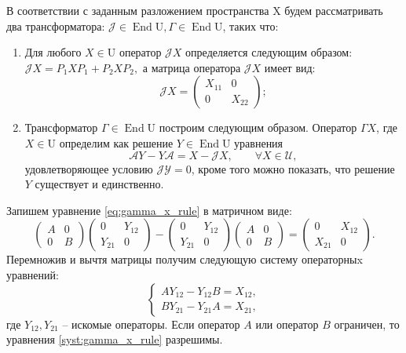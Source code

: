 В соответствии с заданным разложением пространства $\mathrm{X}$ будем рассматривать два трансформатора: $\mathcal{J} \in \operatorname{End}\mathrm{U}, \Gamma \in \operatorname{End}\mathrm{U}$, таких что:
\begin{enumerate}
	\item Для любого $X \in \mathrm{U}$ оператор $\mathcal{J}X$ определяется следующим образом: $\mathcal{J}X = P_1XP_1 + P_2XP_2,$ а матрица оператора $\mathcal{J}X$ имеет вид:
	$$
	\mathcal{J}X = \begin{pmatrix}
		X_{11} & 0 \\
		0 & X_{22}
	\end{pmatrix};
	$$
	\item Трансформатор $\Gamma \in \operatorname{End}\mathrm{U}$ построим следующим образом. Оператор 
	$\Gamma X$, где $X \in \mathrm{U}$ определим как решение $Y \in \operatorname{End}\mathrm{U}$ уравнения
	\begin{equation}\label{eq:gamma_x_rule}
		\mathcal{A}Y - Y\mathcal{A} = X - \mathcal{J}X,\qquad \forall X \in \mathcal{U},
	\end{equation}
	удовлетворяющее условию $\mathcal{J}\mathcal{Y} = 0$, кроме того можно показать, что решение 
	$Y$ существует и единственно.
\end{enumerate}
Запишем уравнение \eqref{eq:gamma_x_rule} в матричном виде:
$$
\begin{pmatrix}
		A & 0 \\
		0 & B
\end{pmatrix}
\begin{pmatrix}
		0 & Y_{12} \\
		Y_{21} & 0
\end{pmatrix} -
\begin{pmatrix}
		0 & Y_{12} \\
		Y_{21} & 0
\end{pmatrix}
\begin{pmatrix}
		A & 0 \\
		0 & B
\end{pmatrix} =
\begin{pmatrix}
		0 & X_{12} \\
		X_{21} & 0
\end{pmatrix}.	 	
$$
Перемножив и вычтя матрицы получим следующую систему операторныx уравнений:
\begin{equation}\label{syst:gamma_x_rule}
	\begin{cases}
		AY_{12} - Y_{12}B = X_{12}, \\
		BY_{21} - Y_{21}A = X_{21},
	\end{cases}
\end{equation}
где $Y_{12}, Y_{21}$ -- искомые операторы. Если оператор $A$ или оператор $B$ ограничен, то уравнения \eqref{syst:gamma_x_rule} разрешимы.

